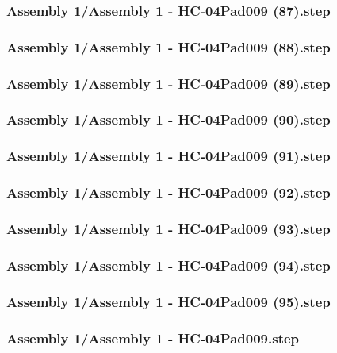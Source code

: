 \documentclass[a4paper,12pt]{article}
\begin{document}
\begin{lstlising}[language=C++]
\subsubsection{Assembly 1/Assembly 1 - HC-04Pad009 (87).step}

\subsubsection{Assembly 1/Assembly 1 - HC-04Pad009 (88).step}

\subsubsection{Assembly 1/Assembly 1 - HC-04Pad009 (89).step}

\subsubsection{Assembly 1/Assembly 1 - HC-04Pad009 (90).step}

\subsubsection{Assembly 1/Assembly 1 - HC-04Pad009 (91).step}

\subsubsection{Assembly 1/Assembly 1 - HC-04Pad009 (92).step}

\subsubsection{Assembly 1/Assembly 1 - HC-04Pad009 (93).step}

\subsubsection{Assembly 1/Assembly 1 - HC-04Pad009 (94).step}

\subsubsection{Assembly 1/Assembly 1 - HC-04Pad009 (95).step}

\subsubsection{Assembly 1/Assembly 1 - HC-04Pad009.step}


\end{lstlising}
\end{document}
